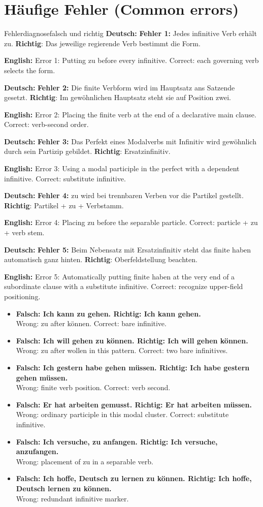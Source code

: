 \documentclass[a4paper,11pt]{article}
\newcommand{\GermanText}[1]{\textbf{Deutsch: }#1\par}
\newcommand{\EnglishText}[1]{{\small\color{SoftGray}\textbf{English: }#1\par}}
\newcommand{\ExampleItem}[2]{\item \textbf{#1}\\{\small\color{SoftGray}#2}}
\newcommand{\DEEN}[2]{\GermanText{#1}\EnglishText{#2}}
\newcommand{\Pair}[2]{\ExampleItem{#1}{#2}}
\begin{document}
\section{Häufige Fehler \textnormal{(Common errors)}}
\begin{grammarentry}{Fehlerdiagnose}{falsch und richtig}
\DEEN{\textbf{Fehler 1:} Jedes infinitive Verb erhält zu. \textbf{Richtig}: Das jeweilige regierende Verb bestimmt die Form.}{Error 1: Putting zu before every infinitive. Correct: each governing verb selects the form.}
\DEEN{\textbf{Fehler 2:} Die finite Verbform wird im Hauptsatz ans Satzende gesetzt. \textbf{Richtig}: Im gewöhnlichen Hauptsatz steht sie auf Position zwei.}{Error 2: Placing the finite verb at the end of a declarative main clause. Correct: verb-second order.}
\DEEN{\textbf{Fehler 3:} Das Perfekt eines Modalverbs mit Infinitiv wird gewöhnlich durch sein Partizip gebildet. \textbf{Richtig}: Ersatzinfinitiv.}{Error 3: Using a modal participle in the perfect with a dependent infinitive. Correct: substitute infinitive.}
\DEEN{\textbf{Fehler 4:} zu wird bei trennbaren Verben vor die Partikel gestellt. \textbf{Richtig}: Partikel + zu + Verbstamm.}{Error 4: Placing zu before the separable particle. Correct: particle + zu + verb stem.}
\DEEN{\textbf{Fehler 5:} Beim Nebensatz mit Ersatzinfinitiv steht das finite haben automatisch ganz hinten. \textbf{Richtig}: Oberfeldstellung beachten.}{Error 5: Automatically putting finite haben at the very end of a subordinate clause with a substitute infinitive. Correct: recognize upper-field positioning.}
\end{grammarentry}
\begin{exbox}\begin{itemize}
\Pair{Falsch: Ich kann zu gehen. \quad Richtig: Ich kann gehen.}{Wrong: zu after können. Correct: bare infinitive.}
\Pair{Falsch: Ich will gehen zu können. \quad Richtig: Ich will gehen können.}{Wrong: zu after wollen in this pattern. Correct: two bare infinitives.}
\Pair{Falsch: Ich gestern habe gehen müssen. \quad Richtig: Ich habe gestern gehen müssen.}{Wrong: finite verb position. Correct: verb second.}
\Pair{Falsch: Er hat arbeiten gemusst. \quad Richtig: Er hat arbeiten müssen.}{Wrong: ordinary participle in this modal cluster. Correct: substitute infinitive.}
\Pair{Falsch: Ich versuche, zu anfangen. \quad Richtig: Ich versuche, anzufangen.}{Wrong: placement of zu in a separable verb.}
\Pair{Falsch: Ich hoffe, Deutsch zu lernen zu können. \quad Richtig: Ich hoffe, Deutsch lernen zu können.}{Wrong: redundant infinitive marker.}
\end{itemize}\end{exbox}
\end{document}
